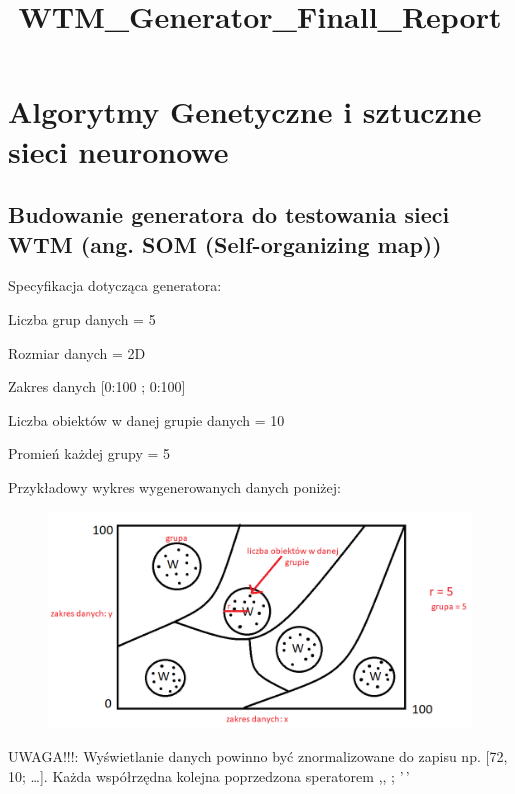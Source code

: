 \documentclass[11pt]{article}
\title{WTM\_Generator\_Finall\_Report}
\begin{document}
    
    \maketitle
    
    

    
    \hypertarget{algorytmy-genetyczne-i-sztuczne-sieci-neuronowe}{%
\section{Algorytmy Genetyczne i sztuczne sieci
neuronowe}\label{algorytmy-genetyczne-i-sztuczne-sieci-neuronowe}}

\hypertarget{budowanie-generatora-do-testowania-sieci-wtm-ang.-som-self-organizing-map}{%
\subsection{Budowanie generatora do testowania sieci WTM (ang. SOM
(Self-organizing
map))}\label{budowanie-generatora-do-testowania-sieci-wtm-ang.-som-self-organizing-map}}

Specyfikacja dotycząca generatora:

Liczba grup danych = 5

Rozmiar danych = 2D

Zakres danych {[}0:100 ; 0:100{]}

Liczba obiektów w danej grupie danych = 10

Promień każdej grupy = 5

Przykładowy wykres wygenerowanych danych poniżej:

\begin{figure}[h!]
  \includegraphics{screeny/WTM_model_example.png}
\end{figure}

UWAGA!!!: Wyświetlanie danych powinno być znormalizowane do zapisu np.
{[}72, 10; \ldots{]}. Każda współrzędna kolejna poprzedzona speratorem
,, ; '\,'
\end{document}
